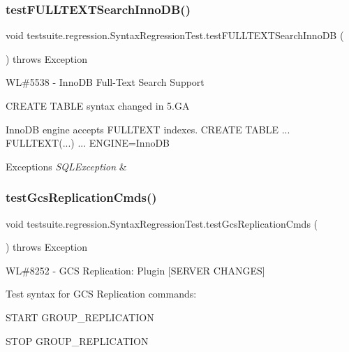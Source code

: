 \subsubsection{\texorpdfstring{test\+F\+U\+L\+L\+T\+E\+X\+T\+Search\+Inno\+D\+B()}{testFULLTEXTSearchInnoDB()}}
{\footnotesize\ttfamily void testsuite.\+regression.\+Syntax\+Regression\+Test.\+test\+F\+U\+L\+L\+T\+E\+X\+T\+Search\+Inno\+DB (\begin{DoxyParamCaption}{ }\end{DoxyParamCaption}) throws Exception}

WL\#5538 -\/ Inno\+DB Full-\/\+Text Search Support

C\+R\+E\+A\+TE T\+A\+B\+LE syntax changed in 5.\+GA

Inno\+DB engine accepts F\+U\+L\+L\+T\+E\+XT indexes. C\+R\+E\+A\+TE T\+A\+B\+LE ... F\+U\+L\+L\+T\+E\+XT(...) ... E\+N\+G\+I\+NE=Inno\+DB


\begin{DoxyExceptions}{Exceptions}
{\em S\+Q\+L\+Exception} & \\
\hline
\end{DoxyExceptions}
\mbox{\label{classtestsuite_1_1regression_1_1_syntax_regression_test_a9382d1a11f854af3618cda075f001204}} 
\subsubsection{\texorpdfstring{test\+Gcs\+Replication\+Cmds()}{testGcsReplicationCmds()}}
{\footnotesize\ttfamily void testsuite.\+regression.\+Syntax\+Regression\+Test.\+test\+Gcs\+Replication\+Cmds (\begin{DoxyParamCaption}{ }\end{DoxyParamCaption}) throws Exception}

WL\#8252 -\/ G\+CS Replication\+: Plugin \mbox{[}S\+E\+R\+V\+ER C\+H\+A\+N\+G\+ES\mbox{]}

Test syntax for G\+CS Replication commands\+:
\begin{DoxyItemize}
\item S\+T\+A\+RT G\+R\+O\+U\+P\+\_\+\+R\+E\+P\+L\+I\+C\+A\+T\+I\+ON
\item S\+T\+OP G\+R\+O\+U\+P\+\_\+\+R\+E\+P\+L\+I\+C\+A\+T\+I\+ON 
\end{DoxyItemize}\mbox{\label{classtestsuite_1_1regression_1_1_syntax_regression_test_a1bf8ec597fe6c78a3e994f1695fbca2b}} 
